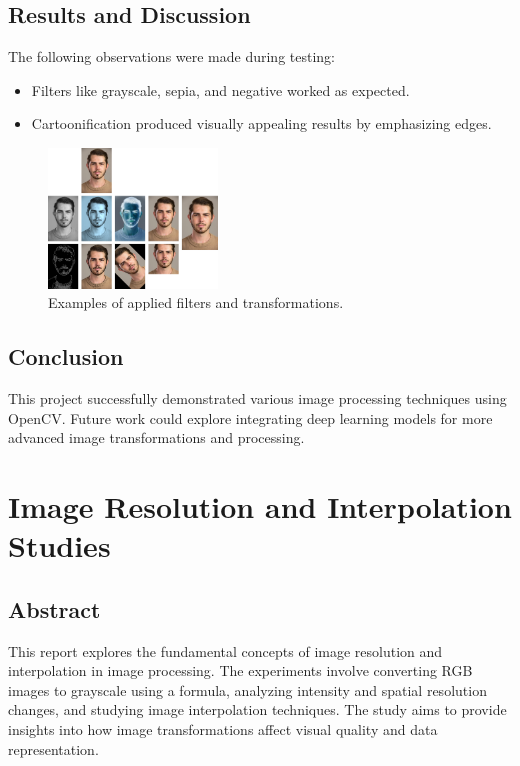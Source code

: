 \documentclass{report}
\begin{document}
\section{Results and Discussion}
The following observations were made during testing:
\begin{itemize}
    \item Filters like grayscale, sepia, and negative worked as expected.
    \item Cartoonification produced visually appealing results by emphasizing edges.
\end{itemize}

\begin{figure}[h!]
    \centering
    \includegraphics[width=0.4\textwidth]{images/Exp-2-Results.png} %
    \caption{Examples of applied filters and transformations.}
    \label{fig:output}
\end{figure}

\section{Conclusion}
This project successfully demonstrated various image processing techniques using OpenCV. Future work could explore integrating deep learning models for more advanced image transformations and processing.

\chapter{Image Resolution and Interpolation Studies} %

\section{Abstract}
This report explores the fundamental concepts of image resolution and interpolation in image processing. The experiments involve converting RGB images to grayscale using a formula, analyzing intensity and spatial resolution changes, and studying image interpolation techniques. The study aims to provide insights into how image transformations affect visual quality and data representation.
\end{document}
